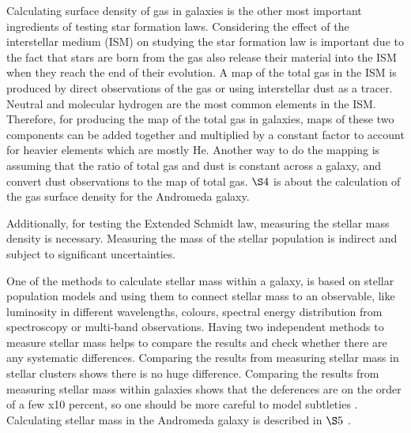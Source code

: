 \documentclass[useAMS,usenatbib]{mn2e}
\begin{document}
Calculating surface density of gas in galaxies is the other most important ingredients of testing star formation laws. Considering the effect of the interstellar medium (ISM) on studying the star formation law is important due to the fact that stars are born from the gas also release their material into the ISM when they reach the end of their evolution. A map of the total gas in the ISM is produced by direct observations of the gas or using interstellar dust as a tracer. Neutral and molecular hydrogen are the most common elements in the ISM. Therefore, for producing the map of the total gas in galaxies, maps of these two components can be added together and multiplied by a constant factor to account for heavier elements which are mostly He. Another way to do the mapping is assuming that the ratio of total gas and dust is constant across a galaxy, and convert dust observations to the map of total gas. $\S4$ is about the calculation of the gas surface density for the Andromeda galaxy.


Additionally, for testing the Extended Schmidt law, measuring the stellar mass density is necessary. Measuring the mass of the stellar population is indirect and subject to significant uncertainties.%

One of the methods to calculate stellar mass within a galaxy, is based on stellar population models \citep[e.g.][]{ Bruzual93, Kotulla09} and using them to connect stellar mass to an observable, like luminosity in different wavelengths, colours, spectral energy distribution from spectroscopy or multi-band observations. Having two independent methods to measure stellar mass helps to compare the results and check whether there are any systematic differences. Comparing the results from measuring stellar mass in stellar clusters shows there is no huge difference. Comparing the results from measuring stellar mass within galaxies shows that the deferences are on the order of a few x10 percent, so one should be more careful to model subtleties \citep{McLaughlin05}. Calculating stellar mass in the Andromeda galaxy is described in  $\S5$ .
\end{document}
